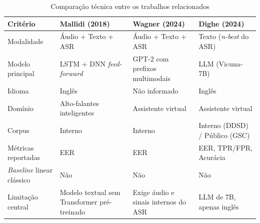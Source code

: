 \documentclass[
    12pt,                %
    openright,           %
    oneside,             %
    a4paper,             %
    english,             %
    brazil               %
]{abntex2}
\begin{document}
\begin{table}[htb]
    \centering
    \caption{Comparação técnica entre os trabalhos relacionados}
    \label{tab:comparacao_trabalhos}
    \small
    \begin{tabularx}{\textwidth}{l|>{\centering\arraybackslash}X|>{\centering\arraybackslash}X|>{\centering\arraybackslash}X}
        \toprule
        \textbf{Critério}
            & \textbf{Mallidi (2018)}
            & \textbf{Wagner (2024)}
            & \textbf{Dighe (2024)} \\
        \midrule
        Modalidade
            & Áudio + Texto + ASR
            & Áudio + Texto + ASR
            & Texto (\textit{n-best} do ASR) \\
        \midrule
        Modelo principal
            & LSTM + DNN \textit{feed-forward}
            & GPT-2 com prefixos multimodais
            & LLM (Vicuna-7B) \\
        \midrule
        Idioma
            & Inglês
            & Não informado
            & Inglês \\
        \midrule
        Domínio
            & Alto-falantes inteligentes
            & Assistente virtual
            & Assistente virtual \\
        \midrule
        Corpus
            & Interno
            & Interno
            & Interno (DDSD) / Público (GSC) \\
        \midrule
        Métricas reportadas
            & EER
            & EER
            & EER, TPR/FPR, Acurácia \\
        \midrule
        \textit{Baseline} linear clássico
            & Não
            & Não
            & Não \\
        \midrule
        Limitação central
            & Modelo textual sem Transformer pré-treinado
            & Exige áudio e sinais internos do ASR
            & LLM de 7B, apenas inglês \\
        \bottomrule
    \end{tabularx}
\end{table}

\vspace{0.4cm}
\end{document}

